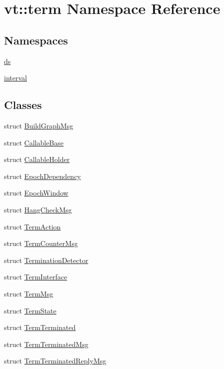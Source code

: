 \hypertarget{namespacevt_1_1term}{}\section{vt\+:\+:term Namespace Reference}
\label{namespacevt_1_1term}
\subsection*{Namespaces}
\begin{DoxyCompactItemize}
\item 
 \hyperlink{namespacevt_1_1term_1_1ds}{ds}
\item 
 \hyperlink{namespacevt_1_1term_1_1interval}{interval}
\end{DoxyCompactItemize}
\subsection*{Classes}
\begin{DoxyCompactItemize}
\item 
struct \hyperlink{structvt_1_1term_1_1_build_graph_msg}{Build\+Graph\+Msg}
\item 
struct \hyperlink{structvt_1_1term_1_1_callable_base}{Callable\+Base}
\item 
struct \hyperlink{structvt_1_1term_1_1_callable_holder}{Callable\+Holder}
\item 
struct \hyperlink{structvt_1_1term_1_1_epoch_dependency}{Epoch\+Dependency}
\item 
struct \hyperlink{structvt_1_1term_1_1_epoch_window}{Epoch\+Window}
\item 
struct \hyperlink{structvt_1_1term_1_1_hang_check_msg}{Hang\+Check\+Msg}
\item 
struct \hyperlink{structvt_1_1term_1_1_term_action}{Term\+Action}
\item 
struct \hyperlink{structvt_1_1term_1_1_term_counter_msg}{Term\+Counter\+Msg}
\item 
struct \hyperlink{structvt_1_1term_1_1_termination_detector}{Termination\+Detector}
\item 
struct \hyperlink{structvt_1_1term_1_1_term_interface}{Term\+Interface}
\item 
struct \hyperlink{structvt_1_1term_1_1_term_msg}{Term\+Msg}
\item 
struct \hyperlink{structvt_1_1term_1_1_term_state}{Term\+State}
\item 
struct \hyperlink{structvt_1_1term_1_1_term_terminated}{Term\+Terminated}
\item 
struct \hyperlink{structvt_1_1term_1_1_term_terminated_msg}{Term\+Terminated\+Msg}
\item 
struct \hyperlink{structvt_1_1term_1_1_term_terminated_reply_msg}{Term\+Terminated\+Reply\+Msg}
\end{DoxyCompactItemize}
